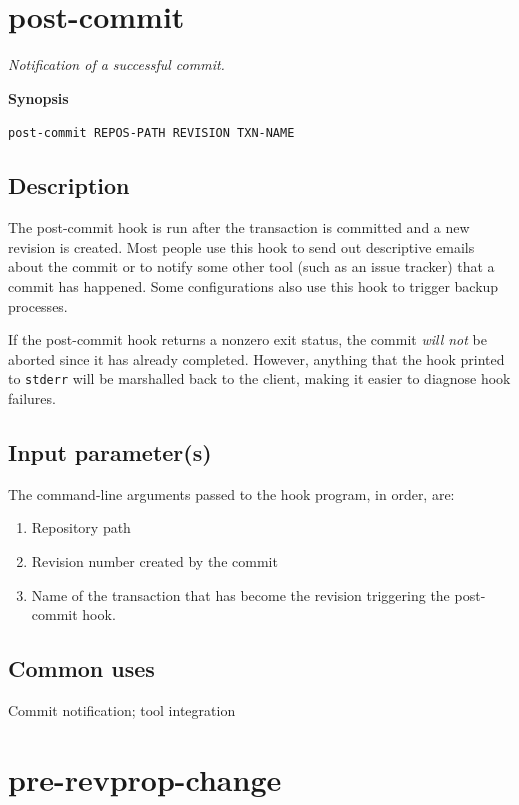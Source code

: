 \section{post-commit}\label{svn.ref.reposhooks.post-commit}

\emph{Notification of a successful commit.}

\textbf{Synopsis}

\texttt{post-commit\ REPOS-PATH\ REVISION\ TXN-NAME}

\subsection{Description}

The post-commit hook is run after the transaction is committed and a new
revision is created. Most people use this hook to send out descriptive
emails about the commit or to notify some other tool (such as an issue
tracker) that a commit has happened. Some configurations also use this
hook to trigger backup processes.

If the post-commit hook returns a nonzero exit status, the commit
\emph{will not} be aborted since it has already completed. However,
anything that the hook printed to \texttt{stderr} will be marshalled
back to the client, making it easier to diagnose hook failures.

\subsection{Input parameter(s)}

The command-line arguments passed to the hook program, in order, are:

\begin{enumerate}
\def\labelenumi{\arabic{enumi}.}
\item
  Repository path
\item
  Revision number created by the commit
\item
  Name of the transaction that has become the revision triggering the
  post-commit hook.
\end{enumerate}

\subsection{Common uses}

Commit notification; tool integration

\section{pre-revprop-change}\label{svn.ref.reposhooks.pre-revprop-change}


